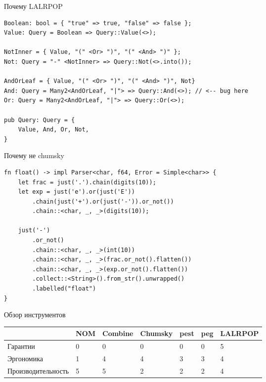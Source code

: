 \begin{frame}[fragile]{Почему LALRPOP}
    \begin{verbatim}
Boolean: bool = { "true" => true, "false" => false };
Value: Query = Boolean => Query::Value(<>);

NotInner = { Value, "(" <Or> ")", "(" <And> ")" };
Not: Query = "-" <NotInner> => Query::Not(<>.into());

AndOrLeaf = { Value, "(" <Or> ")", "(" <And> ")", Not}
And: Query = Many2<AndOrLeaf, "|"> => Query::And(<>); // <-- bug here
Or: Query = Many2<AndOrLeaf, "|"> => Query::Or(<>);

pub Query: Query = {
    Value, And, Or, Not,
}
    \end{verbatim}
\end{frame}

\begin{frame}[fragile]{Почему не chumsky}
    \begin{verbatim}
fn float() -> impl Parser<char, f64, Error = Simple<char>> {
    let frac = just('.').chain(digits(10));
    let exp = just('e').or(just('E'))
        .chain(just('+').or(just('-')).or_not())
        .chain::<char, _, _>(digits(10));

    just('-')
        .or_not()
        .chain::<char, _, _>(int(10))
        .chain::<char, _, _>(frac.or_not().flatten())
        .chain::<char, _, _>(exp.or_not().flatten())
        .collect::<String>().from_str().unwrapped()
        .labelled("float")
}
    \end{verbatim}
\end{frame}

\begin{frame}{Обзор инструментов}
    \large\begin{table}[]
        \begin{tabular} { |l|l|l|l|l|l|l| }
            \hline
                               & NOM & Combine & Chumsky & pest & peg & LALRPOP \\ \hline
            Гарантии           & 0   & 0       & 0       & 0    & 0   & 5       \\ \hline
            Эргономика         & 1   & 4       & 4       & 3    & 3   & 4       \\ \hline
            Производительность & 5   & 5       & 2       & 2    & 2   & 4       \\ \hline
        \end{tabular}
    \end{table}
\end{frame}

